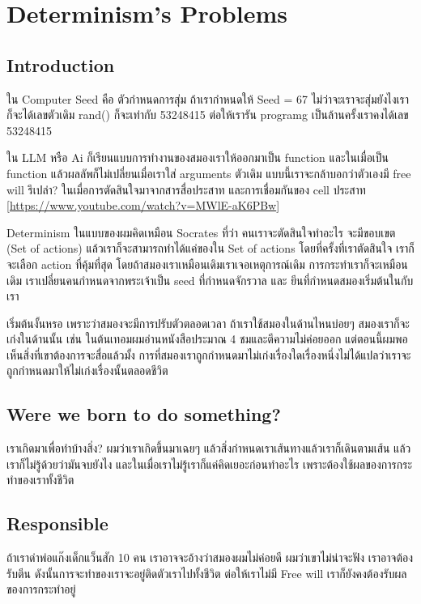 \section{Determinism's Problems}

\subsection{Introduction}
ใน Computer Seed คือ ตัวกำหนดการสุ่ม ถ้าเรากำหนดให้ Seed = 67 ไม่ว่าจะเราจะสุ่มยังไงเราก็จะได้เลขตัวเดิม rand() ก็จะเท่ากับ 53248415
ต่อให้เรารัน programg เป็นล้านครั้งเราคงได้เลข 53248415

ใน LLM หรือ Ai ก็เรียนแบบการทำงานของสมองเราให้ออกมาเป็น function และในเมื่อเป็น function แล้วผลลัพก็ไม่เปลี่ยนเมื่อเราใส่ arguments ตัวเดิม
แบบนี้เราจะกล้าบอกว่าตัวเองมี free will รึเปล่า? ในเมื่อการตัดสินใจมาจากสารสื่อประสาท และการเชื่อมกันของ cell ประสาท  [\url{https://www.youtube.com/watch?v=MWlE-aK6PBw}]

Determinism ในแบบของผมคิดเหมือน Socrates ที่ว่า คนเราจะตัดสินใจทำอะไร จะมีขอบเขต (Set of actions) แล้วเราก็จะสามารถทำได้แค่ของใน Set of actions
โดยที่ครั้งที่เราตัดสินใจ เราก็จะเลือก action ที่คุ้มที่สุด โดยถ้าสมองเราเหมือนเดิมเราเจอเหตุการณ์เดิม การกระทำเราก็จะเหมือนเดิม
เราเปลี่ยนคนกำหนดจากพระเจ้าเป็น seed ที่กำหนดจักรวาล และ ยีนที่กำหนดสมองเริ่มต้นในกับเรา

เริ่มต้นงั้นหรอ เพราะว่าสมองจะมีการปรับตัวตลอดเวลา ถ้าเราใช้สมองในด้านไหนบ่อยๆ สมองเราก็จะเก่งในด้านนั้น
เช่น ในต้นเทอมผมอ่านหนังสือประมาณ 4 ชมและตีความไม่ค่อยออก แต่ตอนนี้ผมพอเห็นสิ่งที่เขาต้องการจะสื่อแล้วมั้ง
การที่สมองเราถูกกำหนดมาไม่เก่งเรื่องใดเรื่องหนึ่งไม่ได้แปลว่าเราจะถูกกำหนดมาให้ไม่เก่งเรื่องนั้นตลอดชีวิต

\subsection{Were we born to do something?}
เราเกิดมาเพื่อทำบ้างสิ่ง? ผมว่าเราเกิดขึ้นมาเฉยๆ แล้วสิ่งกำหนดเราเส้นทางแล้วเราก็เดินตามเส้น แล้วเราก็ไม่รู้ด้วยว่ามันจบยังไง
และในเมื่อเราไม่รู้เราก็แค่คิดเยอะก่อนทำอะไร เพราะต้องใช้ผลของการกระทำของเราทั้งชีวิต

\subsection{Responsible}
ถ้าเราด่าพ่อแก๊งเด็กแว็นสัก 10 คน เราอาจจะอ้างว่าสมองผมไม่ค่อยดี ผมว่าเขาไม่น่าจะฟัง
เราอาจต้องรับตีน ดังนั้นการจะทำของเราจะอยู่ติดตัวเราไปทั้งชีวิต
ต่อให้เราไม่มี Free will เราก็ยังคงต้องรับผลของการกระทำอยู่


